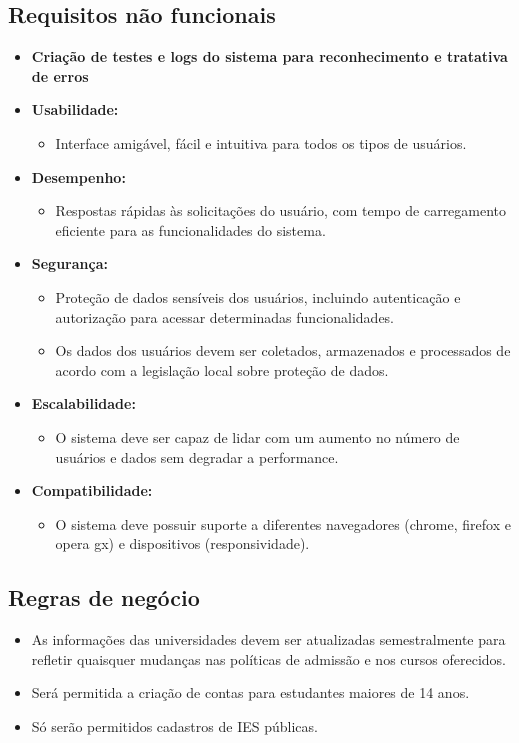 \subsection{Requisitos não funcionais}
\begin{itemize}
    \item \textbf{Criação de testes e logs do sistema para reconhecimento e tratativa de erros}
    
\item \textbf{Usabilidade:}
\begin{itemize}
        \item Interface amigável, fácil e intuitiva para todos os tipos de usuários.
    \end{itemize}

\item \textbf{Desempenho:}
\begin{itemize}
        \item Respostas rápidas às solicitações do usuário, com tempo de carregamento eficiente para as funcionalidades do sistema.
    \end{itemize}

\item \textbf{Segurança:}
\begin{itemize}
        \item Proteção de dados sensíveis dos usuários, incluindo autenticação e autorização para acessar determinadas funcionalidades.
        \item Os dados dos usuários devem ser coletados, armazenados e processados de acordo com a legislação local sobre proteção de dados.
    \end{itemize}

\item \textbf{Escalabilidade:}
\begin{itemize}
        \item O sistema deve ser capaz de lidar com um aumento no número de usuários e dados sem degradar a performance.
    \end{itemize}

\item \textbf{Compatibilidade:}
\begin{itemize}
        \item O sistema deve possuir suporte a diferentes navegadores (chrome, firefox e opera gx) e dispositivos (responsividade).
    \end{itemize}
\end{itemize}


\subsection{Regras de negócio}
\begin{itemize}
\item {As informações das universidades devem ser atualizadas semestralmente para refletir quaisquer mudanças nas políticas de admissão e nos cursos oferecidos.}
\item {Será permitida a criação de contas para estudantes maiores de 14 anos.}
\item {Só serão permitidos cadastros de IES públicas. 
}

\end{itemize}



